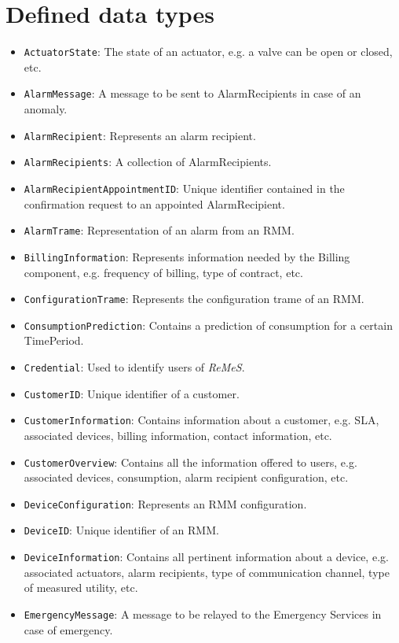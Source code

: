 \documentclass[a4paper,10pt]{article}
\newcommand{\rem}{\emph{ReMeS}\xspace}
\begin{document}
\section{Defined data types}\label{app:datatypes}
\begin{itemize}
	\item \texttt{ActuatorState}: The state of an actuator, e.g. a valve can be open or closed, etc.
	\item \texttt{AlarmMessage}: A message to be sent to AlarmRecipients in case of an anomaly.
	\item \texttt{AlarmRecipient}: Represents an alarm recipient.
    \item \texttt{AlarmRecipients}: A collection of AlarmRecipients.
    \item \texttt{AlarmRecipientAppointmentID}: Unique identifier contained in the confirmation request to an appointed AlarmRecipient.
	\item \texttt{AlarmTrame}: Representation of an alarm from an RMM.
    \item \texttt{BillingInformation}: Represents information needed by the Billing component, e.g. frequency of billing, type of contract, etc. 
    \item \texttt{ConfigurationTrame}: Represents the configuration trame of an RMM.
    \item \texttt{ConsumptionPrediction}: Contains a prediction of consumption for a certain TimePeriod.
    \item \texttt{Credential}: Used to identify users of \rem.
    \item \texttt{CustomerID}: Unique identifier of a customer.
    \item \texttt{CustomerInformation}: Contains information about a customer, e.g. SLA, associated devices, billing information, contact information, etc.
    \item \texttt{CustomerOverview}: Contains all the information offered to users, e.g. associated devices, consumption, alarm recipient configuration, etc.
    \item \texttt{DeviceConfiguration}: Represents an RMM configuration.
    \item \texttt{DeviceID}: Unique identifier of an RMM.
    \item \texttt{DeviceInformation}: Contains all pertinent information about a device, e.g. associated actuators, alarm recipients, type of communication channel, type of measured utility, etc.
    \item \texttt{EmergencyMessage}: A message to be relayed to the Emergency Services in case of emergency.

\end{itemize}
\end{document}
